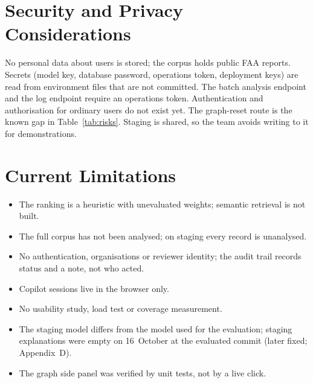 \section{Security and Privacy Considerations}

No personal data about users is stored; the corpus holds public FAA reports. Secrets (model key, database password, operations token, deployment keys) are read from environment files that are not committed. The batch analysis endpoint and the log endpoint require an operations token. Authentication and authorisation for ordinary users do not exist yet. The graph-reset route is the known gap in Table~\ref{tab:risks}. Staging is shared, so the team avoids writing to it for demonstrations.

\section{Current Limitations}

\begin{itemize}
\item The ranking is a heuristic with unevaluated weights; semantic retrieval is not built.
\item The full corpus has not been analysed; on staging every record is unanalysed.
\item No authentication, organisations or reviewer identity; the audit trail records status and a note, not who acted.
\item Copilot sessions live in the browser only.
\item No usability study, load test or coverage measurement.
\item The staging model differs from the model used for the evaluation; staging explanations were empty on 16~October at the evaluated commit (later fixed; Appendix~D).
\item The graph side panel was verified by unit tests, not by a live click.
\end{itemize}
